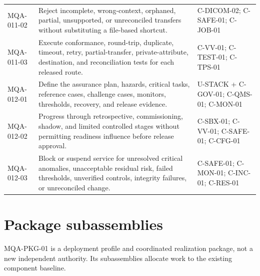 \documentclass[11pt,letterpaper]{article}
\begin{document}
\begin{scriptsize}
\begin{longtable}{@{}L{0.13\textwidth}L{0.48\textwidth}L{0.31\textwidth}@{}}
MQA-011-02 & Reject incomplete, wrong-context, orphaned, partial, unsupported, or unreconciled transfers without substituting a file-based shortcut. & C-DICOM-02; C-SAFE-01; C-JOB-01 \\
MQA-011-03 & Execute conformance, round-trip, duplicate, timeout, retry, partial-transfer, private-attribute, destination, and reconciliation tests for each released route. & C-VV-01; C-TEST-01; C-TPS-01 \\
\addlinespace[3pt]
MQA-012-01 & Define the assurance plan, hazards, critical tasks, reference cases, challenge cases, monitors, thresholds, recovery, and release evidence. & U-STACK + C-GOV-01; C-QMS-01; C-MON-01 \\
MQA-012-02 & Progress through retrospective, commissioning, shadow, and limited controlled stages without permitting readiness influence before release approval. & C-SBX-01; C-VV-01; C-SAFE-01; C-CFG-01 \\
MQA-012-03 & Block or suspend service for unresolved critical anomalies, unacceptable residual risk, failed thresholds, unverified controls, integrity failures, or unreconciled change. & C-SAFE-01; C-MON-01; C-INC-01; C-RES-01 \\
\end{longtable}
\end{scriptsize}

\section{Package subassemblies}

MQA-PKG-01 is a deployment profile and coordinated realization package, not a new independent authority. Its subassemblies allocate work to the existing component baseline.
\end{document}
